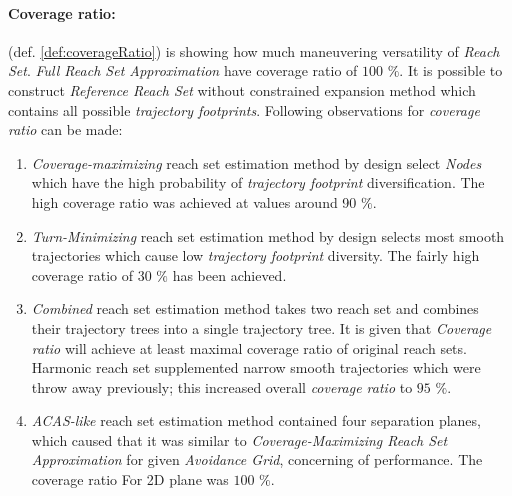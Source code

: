 \paragraph{Coverage ratio:} (def. \ref{def:coverageRatio}) is showing how much maneuvering versatility of \emph{Reach Set}. \emph{Full Reach Set Approximation} have coverage ratio of $100$ $\%$. It is possible to construct \emph{Reference Reach Set} without constrained expansion method which contains all possible \emph{trajectory footprints}. Following observations for \emph{coverage ratio} can be made:
\begin{enumerate}
    \item \emph{Coverage-maximizing} reach set estimation method by design select \emph{Nodes} which have the high probability of \emph{trajectory footprint} diversification. The high coverage ratio was achieved at values around 90 $\%$.
    
    \item \emph{Turn-Minimizing} reach set estimation method by design selects most smooth trajectories which cause low \emph{trajectory footprint} diversity. The fairly high coverage ratio of $30$ $\%$ has been achieved.
    
    \item \emph{Combined} reach set estimation method takes two reach set and combines their trajectory trees into a single trajectory tree. It is given that \emph{Coverage ratio} will achieve at least maximal coverage ratio of original reach sets. Harmonic reach set supplemented narrow smooth trajectories which were throw away previously; this increased overall \emph{coverage ratio} to $95$ $\%$. 
    
    \item \emph{ACAS-like} reach set estimation method contained four separation planes, which caused that it was similar to \emph{Coverage-Maximizing Reach Set Approximation} for given \emph{Avoidance Grid}, concerning of performance. The coverage ratio For 2D plane was $100$ $\%$.
\end{enumerate}

